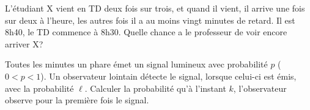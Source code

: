 \begin{exo}
L'{\'e}tudiant X vient en TD deux fois sur trois, et quand il vient, il arrive une fois sur deux {\`a} l'heure, les autres fois il a au moins vingt minutes de retard. Il est 8h40, le TD commence {\`a} 8h30. Quelle chance a le professeur de voir encore arriver X?
\end{exo}


\begin{exo}Toutes les minutes un phare  \'emet un signal lumineux avec probabilit\'e $p$ ($0<p<1$). Un observateur lointain d\'etecte le signal, lorsque celui-ci est  \'emis, avec la probabilit\'e $\ell$. Calculer la probabilit\'e qu'\`a  l'instant $k$, l'observateur observe pour la premi\`ere fois le signal.
\end{exo}

